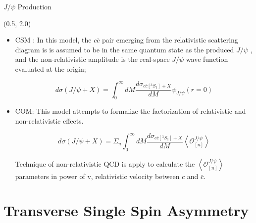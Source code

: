 \documentclass[11pt, xcolor={dvipsnames}, aspectratio = 169]{beamer}
\newcommand{\jpsi}{$J/\psi$ }
\begin{document}
\begin{frame}{\jpsi Production}

\begin{textblock}{14.0}(0.5, 2.0)
\begin{itemize}

\item CSM : In this model, the $c\bar{c}$ pair emerging from the relativistic scattering diagram is  is assumed to be in the same quantum state as the produced \jpsi, and the non-relativistic amplitude is the real-space \jpsi wave function evaluated at the origin;

\begin{equation*}
d\sigma (J/\psi+X) = \int_{0}^{\infty} dM \frac{d\sigma_{c\bar{c}[^{3}S_{1}] + X}}{dM} \psi_{J/\psi} (r=0)
\end{equation*}

\item COM: This model attempts to formalize the factorization of relativistic
and non-relativistic effects.

\begin{equation*}
d\sigma (J/\psi+X) = \Sigma_{n} \int_{0}^{\infty} dM \frac{d\sigma_{c\bar{c}[^{3}S_{1}] + X}}{dM} \left<\mathcal{O}^{J/\psi}_{[n]}\right>
\end{equation*}

Technique of non-relativistic QCD is apply to calculate the $\left<\mathcal{O}^{J/\psi}_{[n]}\right>$ parameters in power of v, relativistic velocity between $c$ and $\bar{c}$.

\end{itemize}
\end{textblock}

\end{frame}

%
%
\section{Transverse Single Spin Asymmetry}
\end{document}
